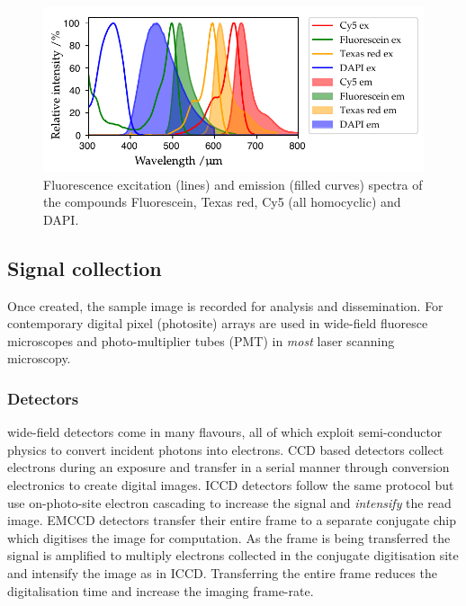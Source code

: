 \begin{figure}
    \centering
    \includegraphics{./fluorphores/++multi_plot.pdf}
    \caption{Fluorescence excitation (lines) and emission (filled curves) spectra of the compounds Fluorescein, Texas red, Cy5 (all homocyclic) and DAPI.}
    \label{fig:fluo_spectra}
\end{figure}

\subsection{Signal collection}

Once created, the sample image is recorded for analysis and dissemination.
For contemporary digital \gls{pixel} (\gls{photosite}) arrays are used in \gls{wide-field} fluoresce microscopes and photo-multiplier tubes (PMT) in \emph{most} laser scanning microscopy.

\subsubsection{Detectors}

\Gls{wide-field} detectors come in many flavours, all of which exploit semi-conductor physics to convert incident photons into electrons.
\Gls{CCD} based detectors collect electrons during an exposure and transfer in a serial manner through conversion electronics to create digital images.
\Gls{ICCD} detectors follow the same protocol but use on-photo-site electron cascading to increase the signal and \emph{intensify} the read image.
\gls{EMCCD} detectors transfer their entire frame to a separate conjugate chip which digitises the image for computation.
As the frame is being transferred the signal is amplified to multiply electrons collected in the conjugate digitisation site and intensify the image as in \gls{ICCD}.
Transferring the entire frame reduces the digitalisation time and increase the imaging frame-rate.

